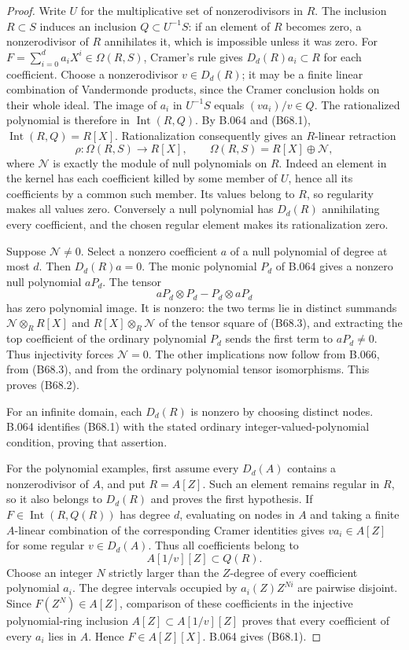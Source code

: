 \begin{proof}
Write $U$ for the multiplicative set of nonzerodivisors in $R$.
The inclusion $R\subset S$ induces an inclusion $Q\subset U^{-1}S$:
if an element of $R$ becomes zero, a nonzerodivisor of $R$ annihilates it,
which is impossible unless it was zero.
For $F=\sum_{i=0}^d a_iX^i\in\Omega(R,S)$, Cramer's rule gives
$D_d(R)a_i\subset R$ for each coefficient. Choose a nonzerodivisor
$v\in D_d(R)$; it may be a finite linear combination of Vandermonde
products, since the Cramer conclusion holds on their whole ideal. The image of $a_i$ in $U^{-1}S$ equals
$(va_i)/v\in Q$. The rationalized polynomial is therefore in
$\operatorname{Int}(R,Q)$. By B.064 and (B68.1),
$\operatorname{Int}(R,Q)=R[X]$.
Rationalization consequently gives an $R$-linear retraction
\[
 \rho:\Omega(R,S)\longrightarrow R[X],\qquad
 \Omega(R,S)=R[X]\oplus\mathcal N,                         \tag{B68.3}
\]
where $\mathcal N$ is exactly the module of null polynomials on $R$.
Indeed an element in the kernel has each coefficient killed by some
member of $U$, hence all its coefficients by a common such member.
Its values belong to $R$, so regularity makes all values zero.
Conversely a null polynomial has $D_d(R)$ annihilating every coefficient,
and the chosen regular element makes its rationalization zero.

Suppose $\mathcal N\ne0$. Select a nonzero coefficient $a$ of a null
polynomial of degree at most $d$. Then $D_d(R)a=0$. The monic polynomial
$P_d$ of B.064 gives a nonzero null polynomial $aP_d$. The tensor
\[
             aP_d\otimes P_d-P_d\otimes aP_d               \tag{B68.4}
\]
has zero polynomial image. It is nonzero: the two terms lie in distinct
summands $\mathcal N\otimes_R R[X]$ and $R[X]\otimes_R\mathcal N$ of the
tensor square of (B68.3), and extracting the top coefficient of the
ordinary polynomial $P_d$ sends the first term to $aP_d\ne0$.
Thus injectivity forces $\mathcal N=0$. The other implications now follow
from B.066, from (B68.3), and from the ordinary polynomial tensor
isomorphisms. This proves (B68.2).

For an infinite domain, each $D_d(R)$ is nonzero by choosing distinct
nodes. B.064 identifies (B68.1) with the stated ordinary
integer-valued-polynomial condition, proving that assertion.

For the polynomial examples, first assume every $D_d(A)$ contains a
nonzerodivisor of $A$, and put $R=A[Z]$. Such an element remains regular
in $R$, so it also belongs to $D_d(R)$ and proves the first hypothesis.
If $F\in\operatorname{Int}(R,Q(R))$ has degree $d$, evaluating on nodes
in $A$ and taking a finite $A$-linear combination of the corresponding
Cramer identities gives $v a_i\in A[Z]$ for some regular $v\in D_d(A)$.
Thus all coefficients belong to
\[
                      A[1/v][Z]\subset Q(R).
\]
Choose an integer $N$ strictly larger than the $Z$-degree of every
coefficient polynomial $a_i$. The degree intervals occupied by
$a_i(Z)Z^{Ni}$ are pairwise disjoint. Since $F(Z^N)\in A[Z]$, comparison
of these coefficients in the injective polynomial-ring inclusion
$A[Z]\subset A[1/v][Z]$ proves that every coefficient of every $a_i$
lies in $A$. Hence $F\in A[Z][X]$. B.064 gives (B68.1).


\end{proof}
